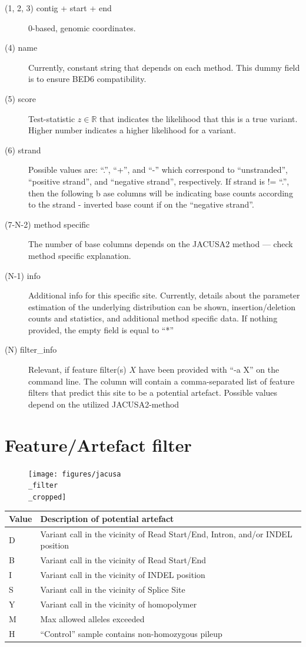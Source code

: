 \documentclass[10pt,a4paper]{article}
\begin{document}
\begin{description}
\item[(1, 2, 3) contig + start + end] 0-based, genomic coordinates.
\item[(4) name] Currently, constant string that depends on each method. This dummy field is to ensure 
BED6 compatibility.
\item[(5) score] Test-statistic $z \in \mathbb{R}$ that indicates the likelihood that this is a true
variant. Higher number indicates a higher likelihood for a variant.
\item[(6) strand] Possible values are: ``.'', ``+'', and ``-'' which correspond to ``unstranded'',
``positive strand'', and ``negative strand'', respectively. If strand is != ``.'', then the following b
ase columns will be indicating base counts according to the strand - inverted base count if on the 
``negative strand''.
\item[(7-N-2) method specific] The number of base columns depends on the JACUSA2 method --- check method specific explanation.
\item[(N-1) info] Additional info for this specific site. Currently, details about the parameter
estimation of the underlying distribution can be shown, insertion/deletion counts and statistics, 
and additional method specific data. If nothing provided, the empty field is equal to ``*''
\item[(N) filter\_info] Relevant, if feature filter(s) $X$ have been provided with ``-a X'' on the
command line. The column will contain a comma-separated list of feature filters that predict this
site to be a potential artefact. Possible values depend on the utilized JACUSA2-method \\ 
\end{description}
\section{Feature/Artefact filter}
\begin{figure}[h]
\centering
\texttt{[image: figures/jacusa\\\_filter\\\_cropped]}
\end{figure}
\begin{tabular}{lp{}}
\textbf{Value} & \textbf{Description of potential artefact} \\
\hline
D & Variant call in the vicinity of Read Start/End, Intron, and/or INDEL position \\
B & Variant call in the vicinity of Read Start/End \\
I & Variant call in the vicinity of INDEL position \\
S & Variant call in the vicinity of Splice Site \\
Y & Variant call in the vicinity of homopolymer \\
M & Max allowed alleles exceeded \\ 
H & ``Control'' sample contains non-homozygous pileup \\
\end{tabular}
\end{document}
